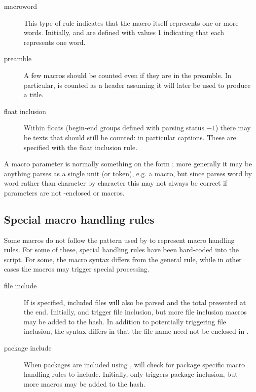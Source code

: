 \documentclass{article}
\begin{document}
\begin{description}
\item[macroword]This type of rule indicates that the macro itself represents one or more words. Initially,  and  are defined with values 1 indicating that each represents one word.

\item[preamble]A few macros should be counted even if they are in the preamble. In particular,  is counted as a header assuming it will later be used to produce a title.

\item[float inclusion]Within floats (begin-end groups defined with parsing status $-1$) there may be texts that should still be counted: in particular captions. These are specified with the float inclusion rule.

\end{description}

A macro parameter is normally something on the form ; more generally it may be anything \TeXcount{} parses as a single unit (or token), e.g. a macro, but since \TeXcount{} parses word by word rather than character by character this may not always be correct if parameters are not \code{\{\}}-enclosed or macros.

\subsection{Special macro handling rules}

Some macros do not follow the pattern used by \TeXcount{} to represent macro handling rules. For some of these, special handling rules have been hard-coded into the \TeXcount{} script. For some, the macro syntax differs from the general rule, while in other cases the macros may trigger special processing.

\begin{description}

\item[file include]If  is specified, included files will also be parsed and the total presented at the end. Initially,  and  trigger file inclusion, but more file inclusion macros may be added to the  hash. In addition to potentially triggering file inclusion, the syntax differs in that the file name need not be enclosed in \code{\{\ldots\}}.

\item[package include]When packages are included using , \TeXcount{} will check for package specific macro handling rules to include. Initially, only  triggers package inclusion, but more macros may be added to the  hash.

\end{description}
\end{document}
